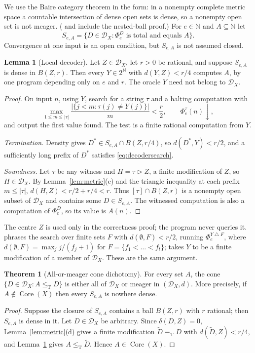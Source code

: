 \documentclass[11pt,letterpaper]{article}
\theoremstyle{definition}
\newtheorem{theorem}[definition]{Theorem}
\newtheorem{lemma}[definition]{Lemma}
\numberwithin{equation}{section}
\newcommand{\N}{\mathbb N}
\newcommand{\Cantor}{2^{\N}}
\newcommand{\leT}{\le_{\mathrm T}}
\newcommand{\eqT}{\equiv_{\mathrm T}}
\newcommand{\DX}[1]{\mathcal D_{#1}}
\newcommand{\Core}{\operatorname{Core}}
\newcommand{\sd}{\mathbin{\triangle}}
\newcommand{\patch}{\mathbin{\triangleright}}
\newcommand{\dn}{{\downarrow}}
\newcommand{\src}[1]{\leavevmode{\sffamily\footnotesize\color{Steel}[#1]}}
\newcommand{\rep}[1]{\leavevmode{\sffamily\small\color{Steel}R#1}}
\begin{document}
We use the Baire category theorem in the form: in a nonempty complete metric space a countable intersection of dense open sets is dense, so a nonempty open set is not meager. (\rep1 and \rep8 include the nested-ball proof.) For $e\in\N$ and $A\subseteq\N$ let
\[
 S_{e,A}=\{D\in\DX X:\Phi_e^D\text{ is total and equals }A\}.
\]
Convergence at one input is an open condition, but $S_{e,A}$ is not assumed closed.

\begin{lemma}[Local decoder]\label{lem:decoder}\src{R1, R8, R9}
Let $Z\in\DX X$, let $r>0$ be rational, and suppose $S_{e,A}$ is dense in $B(Z,r)$. Then every $Y\in\Cantor$ with $d(Y,Z)<r/4$ computes $A$, by one program depending only on $e$ and $r$. The oracle $Y$ need not belong to $\DX X$.
\end{lemma}
\begin{proof}
On input $n$, using $Y$, search for a string $\tau$ and a halting computation with
\begin{equation}\label{eq:decodersearch}
 \max_{1\le m\le|\tau|}\frac{|\{j<m:\tau(j)\ne Y(j)\}|}{m}<\frac r2,\qquad\Phi_e^\tau(n)\dn ,
\end{equation}
and output the first value found. The test is a finite rational computation from $Y$.

\emph{Termination.} Density gives $D^*\in S_{e,A}\cap B(Z,r/4)$, so $d(D^*,Y)<r/2$, and a sufficiently long prefix of $D^*$ satisfies \eqref{eq:decodersearch}.

\emph{Soundness.} Let $\tau$ be any witness and $H=\tau\patch Z$, a finite modification of $Z$, so $H\in\DX X$. By Lemma~\ref{lem:metric}(c) and the triangle inequality at each prefix $m\le|\tau|$, $d(H,Z)<r/2+r/4<r$. Thus $[\tau]\cap B(Z,r)$ is a nonempty open subset of $\DX X$ and contains some $D\in S_{e,A}$. The witnessed computation is also a computation of $\Phi_e^D$, so its value is $A(n)$.
\end{proof}
The centre $Z$ is used only in the correctness proof; the program never queries it. \rep8 phrases the search over finite sets $F$ with $d(\emptyset,F)<r/2$, running $\Phi_e^{Y\sd F}$, where $d(\emptyset,F)=\max_j j/(f_j+1)$ for $F=\{f_1<\dots<f_t\}$; \rep9 takes $Y$ to be a finite modification of a member of $\DX X$. These are the same argument.

\begin{theorem}[All-or-meager cone dichotomy]\label{thm:dichotomy}\src{R1, R8, R9}
For every set $A$, the cone $\{D\in\DX X:A\leT D\}$ is either all of $\DX X$ or meager in $(\DX X,d)$. More precisely, if $A\notin\Core(X)$ then every $S_{e,A}$ is nowhere dense.
\end{theorem}
\begin{proof}
Suppose the closure of $S_{e,A}$ contains a ball $B(Z,r)$ with $r$ rational; then $S_{e,A}$ is dense in it. Let $D\in\DX X$ be arbitrary. Since $\delta(D,Z)=0$, Lemma~\ref{lem:metric}(d) gives a finite modification $\widetilde D\eqT D$ with $d(\widetilde D,Z)<r/4$, and Lemma~\ref{lem:decoder} gives $A\leT\widetilde D$. Hence $A\in\Core(X)$.
\end{proof}
\end{document}
